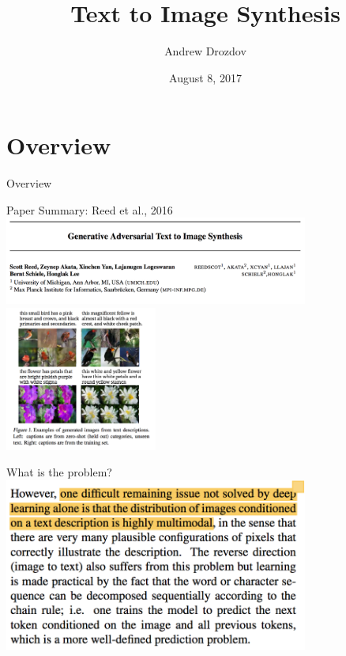 \documentclass{beamer}
\title[Text to Image Synthesis]{Text to Image Synthesis}
\author{Andrew Drozdov}
\institute{NYU Department of Computer Science}
\date{August 8, 2017}
\begin{document}
\begin{frame}
  \titlepage
\end{frame}



\section{Overview}
\begin{frame}{}
\centering
Overview
\end{frame}


\begin{frame}{Paper Summary: Reed et al., 2016}
\centering
\includegraphics[width=10cm]{img/reed/header.png}
\vskip 0.1cm
\includegraphics[width=5cm]{img/reed/figure1.png}
\end{frame}


\begin{frame}{What is the problem?}
\centering
\includegraphics[width=10cm]{img/reed/problem.png}
\end{frame}
\end{document}
